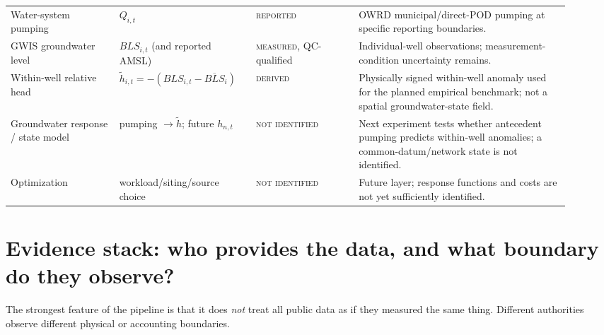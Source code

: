 \documentclass[11pt]{article}
\newcommand{\Reported}{\textsc{reported}}
\newcommand{\Measured}{\textsc{measured}}
\newcommand{\Derived}{\textsc{derived}}
\newcommand{\NotIdentified}{\textsc{not identified}}
\begin{document}
\begin{longtable}{@{}p{0.18\linewidth}p{0.22\linewidth}p{0.17\linewidth}p{0.35\linewidth}@{}}
Water-system pumping & \(Q_{i,t}\) & \Reported & OWRD municipal/direct-POD pumping at specific reporting boundaries. \\
GWIS groundwater level & \(BLS_{i,t}\) (and reported AMSL) & \Measured, QC-qualified & Individual-well observations; measurement-condition uncertainty remains. \\
Within-well relative head & \(\tilde h_{i,t}=-(BLS_{i,t}-\overline{BLS}_i)\) & \Derived & Physically signed within-well anomaly used for the planned empirical benchmark; not a spatial groundwater-state field. \\
Groundwater response / state model & pumping \(\rightarrow \tilde h\); future \(h_{n,t}\) & \NotIdentified & Next experiment tests whether antecedent pumping predicts within-well anomalies; a common-datum/network state is not identified. \\
Optimization & workload/siting/source choice & \NotIdentified & Future layer; response functions and costs are not yet sufficiently identified. \\
\bottomrule
\end{longtable}
\endgroup

\section{Evidence stack: who provides the data, and what boundary do they observe?}

The strongest feature of the pipeline is that it does \emph{not} treat all public data as if they measured the same thing. Different authorities observe different physical or accounting boundaries.
\end{document}
